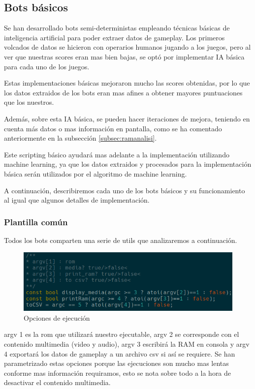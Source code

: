 \subsection{Bots básicos}
\label{subsec:botsbasicos}
Se han desarrollado bots semi-deterministas empleando técnicas básicas de inteligencia artificial para poder extraer datos de gameplay. Los primeros volcados de datos se hicieron con operarios humanos jugando a los juegos, pero al ver que nuestras scores eran mas bien bajas, se optó por implementar IA básica para cada uno de los juegos. 

Estas implementaciones básicas mejoraron mucho las scores obtenidas, por lo que los datos extraidos de los bots eran mas afines a obtener mayores puntuaciones que los nuestros.

Además, sobre esta IA básica, se pueden hacer iteraciones de mejora, teniendo en cuenta más datos o mas información en pantalla, como se ha comentado anteriormente en la subsección \ref{subsec:ramanalisi}.

Este scripting básico ayudará mas adelante a la implementación utilizando machine learning, ya que los datos extraidos y procesados para la implementación básica serán utilizados por el algoritmo de machine learning.

A continuación, describiremos cada uno de los bots básicos y su funcionamiento al igual que algunos detalles de implementación.

\subsubsection{Plantilla común}
\label{subsec:botsbasicos:plantcomun}
Todos los bots comparten una serie de utils que analizaremos a continuación.

\begin{figure}[h]
	\centering
	\includegraphics[width=1\textwidth]{Figures/ALEMediaSettings}
	\caption{Opciones de ejecución}
	\label{fig:ALEMediaSettings}
\end{figure}

argv 1 es la rom que utilizará nuestro ejecutable, argv 2 se corresponde con el contenido multimedia (video y audio), argv 3 escribirá la RAM en consola y argv 4 exportará los datos de gameplay a un archivo \ac{csv} si así se requiere. Se han parametrizado estas opciones porque las ejecuciones son mucho mas lentas conforme mas información requiramos, esto se nota sobre todo a la hora de desactivar el contenido multimedia.

